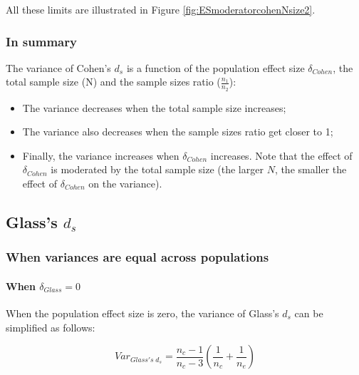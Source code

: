 \documentclass[
  man]{apa6}
\providecommand{\tightlist}{%
  \setlength{\itemsep}{0pt}\setlength{\parskip}{0pt}}
\begin{document}
All these limits are illustrated in Figure \ref{fig:ESmoderatorcohenNsize2}.

\hypertarget{in-summary}{%
\subsubsection{In summary}\label{in-summary}}

The variance of Cohen's \(d_s\) is a function of the population effect size \(\delta_{Cohen}\), the total sample size (N) and the sample sizes ratio (\(\frac{n_1}{n_2}\)):

\begin{itemize}
\tightlist
\item
  The variance decreases when the total sample size increases;\\
\item
  The variance also decreases when the sample sizes ratio get closer to 1;\\
\item
  Finally, the variance increases when \(\delta_{Cohen}\) increases. Note that the effect of \(\delta_{Cohen}\) is moderated by the total sample size (the larger \(N\), the smaller the effect of \(\delta_{Cohen}\) on the variance).
\end{itemize}

\hypertarget{glasss-d_s}{%
\subsection{\texorpdfstring{Glass's \(d_s\)}{Glass's d\_s}}\label{glasss-d_s}}

\hypertarget{when-variances-are-equal-across-populations-1}{%
\subsubsection{When variances are equal across populations}\label{when-variances-are-equal-across-populations-1}}

\hypertarget{when-delta_glass0}{%
\paragraph{\texorpdfstring{When \(\delta_{Glass}=0\)}{When \textbackslash delta\_\{Glass\}=0}}\label{when-delta_glass0}}

When the population effect size is zero, the variance of Glass's \(d_s\) can be simplified as follows:

\[Var_{Glass's \; d_s} = \frac{n_c-1}{n_c-3} \left( \frac{1}{n_c}+\frac{1}{n_e}\right)\]
\end{document}
